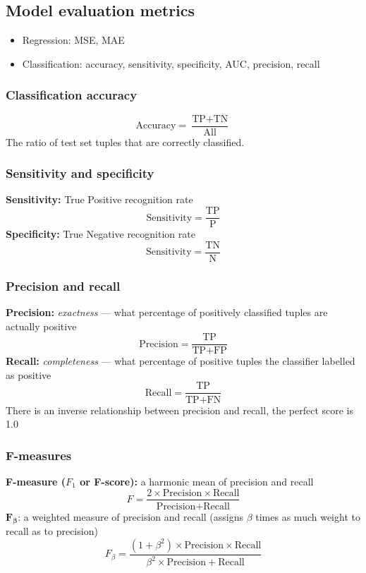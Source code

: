 \documentclass{article}
\begin{document}
    \subsection{Model evaluation metrics}
    \begin{itemize}
        \item Regression: MSE, MAE
        \item Classification: accuracy, sensitivity, specificity, AUC, precision, recall
    \end{itemize}

        \subsubsection{Classification accuracy}
        \[ \text{Accuracy} = \frac{\text{TP} + \text{TN}}{\text{All}} \]
        The ratio of test set tuples that are correctly classified.

        \subsubsection{Sensitivity and specificity}
        \textbf{Sensitivity:} True Positive recognition rate
        \[ \text{Sensitivity} = \frac{\text{TP}}{\text{P}} \]
        \textbf{Specificity:} True Negative recognition rate
        \[ \text{Sensitivity} = \frac{\text{TN}}{\text{N}} \]

        \subsubsection{Precision and recall}
        \textbf{Precision:} \textit{exactness} --- what percentage of positively classified tuples are actually positive
        \[ \text{Precision} = \frac{\text{TP}}{\text{TP} + \text{FP}} \]
        \textbf{Recall:} \textit{completeness} --- what percentage of positive tuples the classifier labelled as positive
        \[ \text{Recall} = \frac{\text {TP}}{\text{TP} + \text{FN}} \]
        There is an inverse relationship between precision and recall, the perfect score is 1.0

        \subsubsection{F-measures}
        \textbf{F-measure ($F_1$ or F-score):} a harmonic mean of precision and recall
        \[ F = \frac{2 \times \text{Precision} \times \text{Recall}}{\text{Precision} + \text{Recall}} \]
        $\mathbf{F_\beta}\textbf{:}$ a weighted measure of precision and recall (assigns $\beta$ times as much weight to recall as to precision)
        \[ F_\beta = \frac{(1 + \beta^2) \times \text{Precision} \times \text{Recall}}{\beta^2 \times \text{Precision} + \text{Recall}} \]
\end{document}
